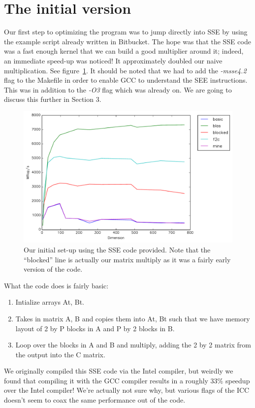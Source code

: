 \documentclass{article}
\begin{document}
\section{The initial version}
  Our first step to optimizing the program was to jump directly into SSE by using the example script already written in Bitbucket.
  The hope was that the SSE code was a fast enough kernel that we can build a good multiplier around it; indeed, an immediate
  speed-up was noticed! It approximately doubled our naive multiplication. See figure~\ref{fig:initial}. It should be noted that we had to add the \textit{-msse4.2} flag to the Makefile in order to enable GCC to understand the SEE instructions. This was in addition to the \textit{-O3} flag which was already on. We are going to discuss this further in Section 3.

  \begin{figure}[h]
    \centering
    \includegraphics[width=.7\textwidth]{initial.pdf}
    \caption{Our initial set-up using the SSE code provided. Note that the ``blocked'' line is actually our matrix multiply as it was a fairly early version of the code.}
    \label{fig:initial}
  \end{figure}

  What the code does is fairly basic:
  \begin{enumerate}
    \item Intialize arrays At, Bt.
    \item Takes in matrix A, B and copies them into At, Bt such that we have memory layout of 2 by P blocks in A and P by 2 blocks in B.
    \item Loop over the blocks in A and B and multiply, adding the 2 by 2 matrix from the output into the C matrix.
  \end{enumerate}

  We originally compiled this SSE code via the Intel compiler, but weirdly we found that compiling it with the GCC compiler results in a roughly
  33\% speedup over the Intel compiler! We're actually not sure why, but various flags of the ICC doesn't seem to coax the same performance
  out of the code.
\end{document}
